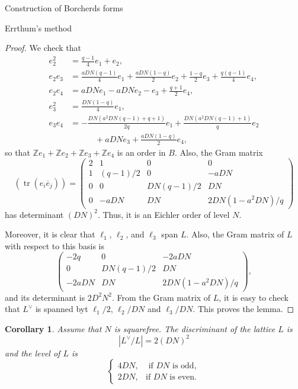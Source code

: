 \documentclass{amsart}
\newcounter{lemma}
\newtheorem{Corollary}[lemma]{Corollary}
\theoremstyle{definition}
\def\tr{\operatorname{tr}}
\def\Z{\mathbb Z}
\begin{document}
\begin{section}{Construction of Borcherds forms}
\begin{subsection}{Errthum's method}
\begin{proof}
  We check that
  \begin{equation*}
  \begin{split}
    e_2^2&=\frac{q-1}4e_1+e_2, \\
    e_2e_3&=\frac{aDN(q-1)}4e_1+\frac{aDN(1-q)}2e_2+\frac{1-q}2e_3
    +\frac{q(q-1)}4e_4, \\
    e_2e_4&=aDNe_1-aDNe_2-e_3+\frac{q+1}2e_4, \\
    e_3^2&=\frac{DN(1-q)}4e_1, \\
    e_3e_4&=-\frac{DN(a^2DN(q-1)+q+1)}{2q}e_1
     +\frac{DN(a^2DN(q-1)+1)}qe_2 \\
    &\qquad\quad+aDNe_3+\frac{aDN(1-q)}2e_4,
  \end{split}
  \end{equation*}
  so that $\Z e_1+\Z e_2+\Z e_3+\Z e_4$ is an order in $B$.
  Also, the Gram matrix
$$
  (\tr(e_i\overline e_j))=\begin{pmatrix}
  2 & 1 & 0 & 0\\ 1 & (q-1)/2 & 0 & -aDN \\
  0 & 0 & DN(q-1)/2 & DN \\ 0 & -aDN & DN & 2DN(1-a^2DN)/q \end{pmatrix}
$$
has determinant $(DN)^2$. Thus, it is an Eichler order of level $N$.

Moreover, it is clear that $\ell_1$, $\ell_2$, and $\ell_3$ span
$L$. Also, the Gram matrix of $L$ with respect to this basis is
\begin{equation} \label{equation: Gram L}
  \begin{pmatrix}
  -2q & 0 & -2aDN \\ 0 & DN(q-1)/2 & DN \\ -2aDN & DN
  & 2DN(1-a^2DN)/q \end{pmatrix},
\end{equation}
and its determinant is $2D^2N^2$. From the Gram matrix of $L$, it is
easy to check that $L^\vee$ is spanned byt $\ell_1/2$, $\ell_2/DN$ and
$\ell_3/DN$. This proves the lemma.
\end{proof}

\begin{Corollary}\label{corollary: level}
Assume that $N$ is squarefree.
The discriminant of the lattice $L$ is $$|L^{\vee}/L|=2(DN)^2$$ and
the level of $L$ is
\begin{equation*}
\begin{cases}4DN,& \text{ if }DN\text{ is odd}, \\
2DN,&\text{if }DN\text{ is even}.
\end{cases}
\end{equation*}
\end{Corollary}


\end{subsection}
\end{section}
\end{document}
